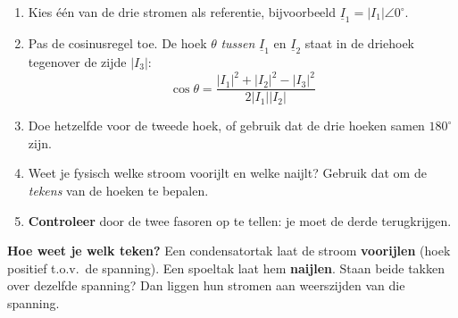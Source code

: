 \documentclass[a4paper,11pt]{article}
\begin{document}
\begin{theorie}[Werkwijze]
    \begin{enumerate}
        \item Kies één van de drie stromen als referentie, bijvoorbeeld
              $\underline{I}_1 = |I_1|\angle 0^\circ$.
        \item Pas de cosinusregel toe. De hoek $\theta$ \emph{tussen} $\underline{I}_1$ en
              $\underline{I}_2$ staat in de driehoek tegenover de zijde $|I_3|$:
              \[\cos\theta = \frac{|I_1|^2 + |I_2|^2 - |I_3|^2}{2|I_1||I_2|}\]
        \item Doe hetzelfde voor de tweede hoek, of gebruik dat de drie hoeken samen $180^\circ$ zijn.
        \item Weet je fysisch welke stroom voorijlt en welke naijlt? Gebruik dat om de \emph{tekens}
              van de hoeken te bepalen.
        \item \textbf{Controleer} door de twee fasoren op te tellen: je moet de derde terugkrijgen.
    \end{enumerate}
\end{theorie}

\textbf{Hoe weet je welk teken?} Een condensatortak laat de stroom \textbf{voorijlen} (hoek
positief t.o.v.\ de spanning). Een spoeltak laat hem \textbf{naijlen}. Staan beide takken over
dezelfde spanning? Dan liggen hun stromen aan weerszijden van die spanning.
\end{document}
